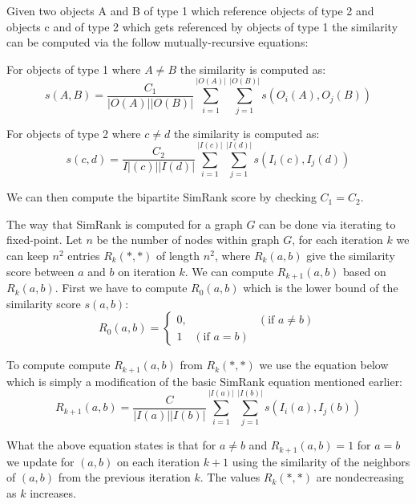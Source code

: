 \begin{definition}\label{def:bipartite_simrank} Given two objects A and B of type 1 which reference objects of type 2 and objects c and of type 2 which gets referenced by objects of type 1 the similarity can be computed via the follow mutually-recursive equations:
	
	For objects of type 1 where $A \neq B$ the similarity is computed as:
	\begin{equation}\label{eq:bipartite_simrank1}
	s(A,B)= \frac{C_1}{|O(A)||O(B)|}\sum^{|O(A)|}_{i=1}\sum^{|O(B)|}_{j=1}s(O_i(A),O_j(B))
	\end{equation}
	
	For objects of type 2 where $c \neq d$ the similarity is computed as:
	\begin{equation}\label{eq:bipartite_simrank2}
	s(c,d)= \frac{C_2}{I|(c)||I(d)|}\sum^{|I(c)|}_{i=1}\sum^{|I(d)|}_{j=1}s(I_i(c),I_j(d))
	\end{equation}
	
	We can then compute the bipartite SimRank score by checking $C_1 = C_2$\cite{10.1145/775047.775126}.
\end{definition}

The way that SimRank is computed for a graph $G$ can be done via iterating to fixed-point. Let $n$ be the number of nodes within graph $G$, for each iteration $k$ we can keep $n^2$ entries $R_k(*,*)$ of length $n^2$, where $R_k(a,b)$ give the similarity score between $a$ and $b$ on iteration $k$\cite{10.1145/775047.775126}. We can compute $R_{k+1}(a,b)$ based on $R_k(a,b)$. First we have to compute $R_0(a,b)$ which is the lower bound of the similarity score $s(a,b)$:
\begin{equation}
R_0(a,b)= \begin{cases}
0, & (\text{if } a \neq b) \\

1 \quad (\text{if } a = b)
\end{cases}
\end{equation}

To compute compute $R_{k+1}(a,b)$ from $R_k(*,*)$ we use the equation below which is simply a modification of the basic SimRank equation mentioned earlier:
\begin{equation}
R_{k+1}(a,b)= \frac{C}{|I(a)||I(b)|}\sum^{|I(a)|}_{i=1}\sum^{|I(b)|}_{j=1}s(I_i(a),I_j(b))
\end{equation}

What the above equation states is that for $a \neq b$ and $R_{k+1}(a,b) = 1$ for $a = b$ we update for $(a,b)$ on each iteration $k+1$ using the similarity of the neighbors of $(a,b)$ from the previous iteration $k$. The values $R_k(*,*)$ are nondecreasing as $k$ increases. 
